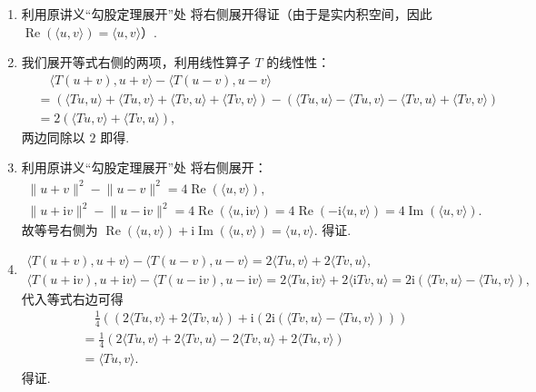 \documentclass[UTF8,12pt,a4paper,fontset=fandol]{ctexart}
\begin{document}
\begin{solve}
\begin{enumerate}
        \item 利用原讲义“勾股定理展开”处 将右侧展开得证（由于是实内积空间，因此 $\operatorname{Re}(\langle u, v \rangle) = \langle u, v \rangle$）.

        \item 我们展开等式右侧的两项，利用线性算子 $T$ 的线性性：
        \begin{align*}
            & \quad \langle T(u + v), u + v\rangle - \langle T(u - v), u - v\rangle \\
            & = \left(\langle Tu, u \rangle + \langle Tu, v \rangle + \langle Tv, u \rangle + \langle Tv, v \rangle\right) - \left(\langle Tu, u \rangle - \langle Tu, v \rangle - \langle Tv, u \rangle + \langle Tv, v \rangle\right) \\
            & = 2 (\langle Tu, v \rangle + \langle Tv, u \rangle),
        \end{align*}
        两边同除以 $2$ 即得.

        \item 利用原讲义“勾股定理展开”处 将右侧展开：
        \begin{gather*}
            \lVert u + v \rVert^2 - \lVert u - v \rVert^2 = 4 \operatorname{Re}(\langle u, v \rangle), \\
            \lVert u + \mathrm{i} v \rVert^2 - \lVert u - \mathrm{i} v \rVert^2 = 4 \operatorname{Re}(\langle u, \mathrm{i} v \rangle) = 4 \operatorname{Re}(-\mathrm{i} \langle u, v \rangle) = 4 \operatorname{Im}(\langle u, v \rangle).
        \end{gather*}
        故等号右侧为 $ \operatorname{Re}(\langle u, v \rangle) + \mathrm{i} \operatorname{Im}(\langle u, v \rangle) = \langle u, v \rangle$. 得证.

        \item
        \begin{gather*}
            \langle T(u + v), u + v\rangle - \langle T(u - v), u - v\rangle = 2\langle Tu, v \rangle + 2\langle Tv, u \rangle,\\
            \langle T(u + \mathrm{i} v), u + \mathrm{i} v\rangle - \langle T(u - \mathrm{i} v), u - \mathrm{i} v\rangle = 2\langle Tu, \mathrm{i} v \rangle + 2\langle \mathrm{i} Tv, u \rangle = 2\mathrm{i} (\langle Tv, u \rangle - \langle Tu, v \rangle),
        \end{gather*}
        代入等式右边可得
        \begin{align*}
            &\quad \frac{1}{4}\left(\left(2\langle Tu, v \rangle + 2\langle Tv, u \rangle\right) + \mathrm{i} \left(2\mathrm{i} (\langle Tv, u \rangle - \langle Tu, v \rangle)\right)\right) \\
            & = \frac{1}{4}\left(2\langle Tu, v \rangle + 2\langle Tv, u \rangle - 2\langle Tv, u \rangle + 2\langle Tu, v \rangle\right) \\
            & = \langle Tu, v \rangle.
        \end{align*}
        得证.
    \end{enumerate}
\end{solve}
\end{document}
